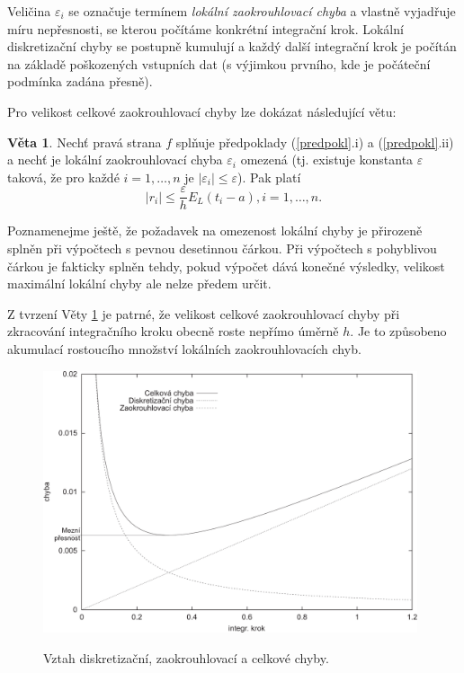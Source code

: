 \documentclass[a4paper, 12pt]{book}
\theoremstyle{definition}
\newtheorem{theorem}{Věta}[section]
\begin{document}
Veličina $\varepsilon_i$ se označuje termínem {\em lokální zaokrouhlovací chyba}
a vlastně vyjadřuje míru nepřesnosti, se kterou počítáme konkrétní integrační 
krok. Lokální diskretizační chyby se postupně kumulují a každý další integrační
krok je počítán na základě poškozených vstupních dat (s výjimkou prvního, kde 
je počáteční podmínka zadána přesně).

Pro velikost celkové zaokrouhlovací chyby lze dokázat následující větu:
\begin{theorem}\label{Veta2.5}
Nechť pravá strana $f$ splňuje předpoklady (\ref{predpokl}.i) a (\ref{predpokl}.ii) 
a nechť je lokální zaokrouhlovací chyba $\varepsilon_i$ omezená (tj. existuje 
konstanta $\varepsilon$ taková, že pro každé $i=1,\dots,n$ je $|\varepsilon_i|
\leq\varepsilon$). Pak platí
\begin{equation}\label{zaokrchEuler}
|r_i|\leq \frac\varepsilon h E_L(t_i-a), i=1,\dots,n.
\end{equation}
\end{theorem}

Poznamenejme ještě, že požadavek na omezenost lokální chyby je přirozeně splněn 
při výpočtech s pevnou desetinnou čárkou. Při výpočtech s pohyblivou čárkou je 
fakticky splněn tehdy, pokud výpočet dává konečné výsledky, velikost maximální 
lokální chyby ale nelze předem určit.

Z tvrzení Věty \ref{Veta2.5} je patrné, že velikost celkové zaokrouhlovací chyby
při zkracování integračního kroku obecně roste nepřímo úměrně $h$. Je to způsobeno
akumulací rostoucího množství lokálních zaokrouhlovacích chyb.

\begin{figure}[ht]
\centering
\includegraphics[width=0.98\textwidth]{chyby}\\
\caption[]{Vztah diskretizační, zaokrouhlovací a celkové chyby.}
\label{chyby}
\end{figure}
\end{document}
